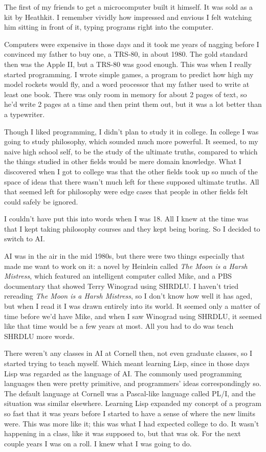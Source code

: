 The first of my friends to get a microcomputer built it himself. It was
sold as a kit by Heathkit. I remember vividly how impressed and envious
I felt watching him sitting in front of it, typing programs right into
the computer.

Computers were expensive in those days and it took me years of nagging
before I convinced my father to buy one, a TRS-80, in about 1980. The
gold standard then was the Apple II, but a TRS-80 was good enough. This
was when I really started programming. I wrote simple games, a program
to predict how high my model rockets would fly, and a word processor
that my father used to write at least one book. There was only room in
memory for about 2 pages of text, so he'd write 2 pages at a time and
then print them out, but it was a lot better than a typewriter.

Though I liked programming, I didn't plan to study it in college. In
college I was going to study philosophy, which sounded much more
powerful. It seemed, to my naive high school self, to be the study of
the ultimate truths, compared to which the things studied in other
fields would be mere domain knowledge. What I discovered when I got to
college was that the other fields took up so much of the space of ideas
that there wasn't much left for these supposed ultimate truths. All that
seemed left for philosophy were edge cases that people in other fields
felt could safely be ignored.

I couldn't have put this into words when I was 18. All I knew at the
time was that I kept taking philosophy courses and they kept being
boring. So I decided to switch to AI.

AI was in the air in the mid 1980s, but there were two things especially
that made me want to work on it: a novel by Heinlein called \emph{The
Moon is a Harsh Mistress}, which featured an intelligent computer called
Mike, and a PBS documentary that showed Terry Winograd using SHRDLU. I
haven't tried rereading \emph{The Moon is a Harsh Mistress}, so I don't
know how well it has aged, but when I read it I was drawn entirely into
its world. It seemed only a matter of time before we'd have Mike, and
when I saw Winograd using SHRDLU, it seemed like that time would be a
few years at most. All you had to do was teach SHRDLU more words.

There weren't any classes in AI at Cornell then, not even graduate
classes, so I started trying to teach myself. Which meant learning Lisp,
since in those days Lisp was regarded as the language of AI. The
commonly used programming languages then were pretty primitive, and
programmers' ideas correspondingly so. The default language at Cornell
was a Pascal-like language called PL/I, and the situation was similar
elsewhere. Learning Lisp expanded my concept of a program so fast that
it was years before I started to have a sense of where the new limits
were. This was more like it; this was what I had expected college to do.
It wasn't happening in a class, like it was supposed to, but that was
ok. For the next couple years I was on a roll. I knew what I was going
to do.

